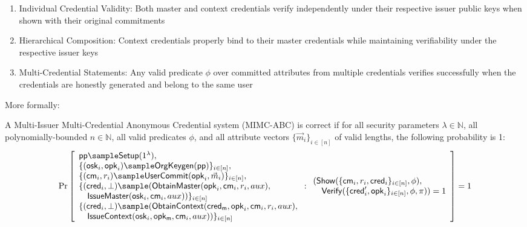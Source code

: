 \begin{enumerate}
    \item Individual Credential Validity: Both master and context credentials verify independently under their respective issuer public keys when shown with their original commitments
    \item Hierarchical Composition: Context credentials properly bind to their master credentials while maintaining verifiability under the respective issuer keys
    \item Multi-Credential Statements: Any valid predicate $\phi$ over committed attributes from multiple credentials verifies successfully when the credentials are honestly generated and belong to the same user
\end{enumerate}

\noindent More formally:

\begin{definition}[Correctness]
A Multi-Issuer Multi-Credential Anonymous Credential system (MIMC-ABC) is correct if for all security parameters $\lambda \in \mathbb{N}$, all polynomially-bounded $n \in \mathbb{N}$, all valid predicates $\phi$, and all attribute vectors $\{\vec{m}_i\}_{i \in [n]}$ of valid lengths, the following probability is 1:
\[
        \Pr
            \left [
            \begin{array}{l}
                \ppar \sample \mathsf{Setup}(1^\lambda),\\
        \{(\mathsf{osk}_i, \mathsf{opk}_i) \sample \mathsf{OrgKeygen}(\ppar)\}_{i \in [n]},\\
        \{(\mathsf{cm}_i, r_i) \sample \mathsf{UserCommit}(\mathsf{opk}_i, \vec{m}_i)\}_{i \in [n]},\\
        \{(\mathsf{cred}_i, \bot) \sample (\mathsf{ObtainMaster}(\mathsf{opk}_i, \mathsf{cm}_i, r_i, aux),\\
        \quad\mathsf{IssueMaster}(\mathsf{osk}_i, \mathsf{cm}_i, aux))\}_{i \in [n]} \\
         \{(\mathsf{cred}_i, \bot) \sample (\mathsf{ObtainContext}(\mathsf{cred_m}, \mathsf{opk}_i, \mathsf{cm}_i, r_i, aux),\\
        \quad\mathsf{IssueContext}(\mathsf{osk}_i, \mathsf{opk_m}, \mathsf{cm}_i, aux))\}_{i \in [n]}
            \end{array}
                : 
                \begin{array}{l}
                   (\mathsf{Show}(\{\mathsf{cm}_i, r_i, \mathsf{cred}_i\}_{i \in [n]}, \phi),\\
                    \quad\mathsf{Verify}(\{\mathsf{cred}'_i, \mathsf{opk}_i\}_{i \in [n]}, \phi, \pi)) = 1
                \end{array}
                \right ]
             = 1
\]
\
\end{definition}

















